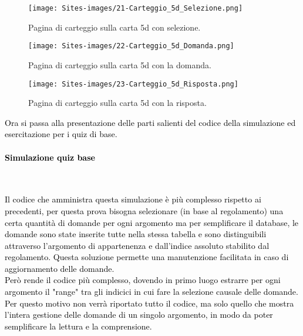 	\begin{minipage}{\textwidth}
	\begin{figure}[H]
		\begin{center}
			\texttt{[image: Sites-images/21-Carteggio\_5d\_Selezione.png]}
			\caption{Pagina di carteggio sulla carta 5d con selezione.}
		\end{center}
	\end{figure}

\begin{figure}[H]
	\begin{center}
		\texttt{[image: Sites-images/22-Carteggio\_5d\_Domanda.png]}
		\caption{Pagina di carteggio sulla carta 5d con la domanda.}
	\end{center}
\end{figure}

\begin{figure}[H]
	\begin{center}
		\texttt{[image: Sites-images/23-Carteggio\_5d\_Risposta.png]}
		\caption{Pagina di carteggio sulla carta 5d con la risposta.}
	\end{center}
\end{figure}
\end{minipage}


\textcolor{black}{Ora si passa alla presentazione delle parti salienti del codice della simulazione ed esercitazione per i quiz di base.}\\

\paragraph{\textcolor{black}{Simulazione quiz base}}\leavevmode\\
\raggedright
\textcolor{black}{Il codice che amministra questa simulazione è più complesso rispetto ai precedenti, per questa prova bisogna selezionare (in base al regolamento) una certa quantità di domande per ogni argomento ma per semplificare il database, le domande sono state inserite tutte nella stessa tabella e sono distinguibili attraverso l'argomento di appartenenza e dall'indice assoluto stabilito dal regolamento. Questa soluzione permette una manutenzione facilitata in caso di aggiornamento delle domande.\\
Però rende il codice più complesso, dovendo in primo luogo estrarre per ogni argomento il "range" tra gli indicici in cui fare la selezione causale delle domande.\\
Per questo motivo non verrà riportato tutto il codice, ma solo quello che mostra l'intera gestione delle domande di un singolo argomento, in modo da poter semplificare la lettura e la comprensione.}\\

